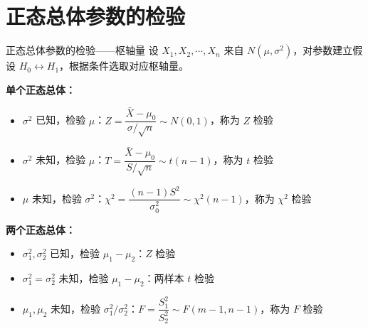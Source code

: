 \section{正态总体参数的检验}
\begin{definition}{正态总体参数的检验——枢轴量}
设 $X_1, X_2, \cdots, X_n$ 来自 $N(\mu, \sigma^2)$，对参数建立假设 $H_0 \leftrightarrow H_1$，根据条件选取对应枢轴量。

\textbf{单个正态总体：}
\begin{itemize}
    \item $\sigma^2$ 已知，检验 $\mu$：$Z = \dfrac{\bar{X}-\mu_0}{\sigma/\sqrt{n}} \sim N(0,1)$，称为 $Z$ 检验
    \item $\sigma^2$ 未知，检验 $\mu$：$T = \dfrac{\bar{X}-\mu_0}{S/\sqrt{n}} \sim t(n-1)$，称为 $t$ 检验
    \item $\mu$ 未知，检验 $\sigma^2$：$\chi^2 = \dfrac{(n-1)S^2}{\sigma_0^2} \sim \chi^2(n-1)$，称为 $\chi^2$ 检验
\end{itemize}

\textbf{两个正态总体：}
\begin{itemize}
    \item $\sigma_1^2, \sigma_2^2$ 已知，检验 $\mu_1-\mu_2$：$Z$ 检验
    \item $\sigma_1^2 = \sigma_2^2$ 未知，检验 $\mu_1-\mu_2$：两样本 $t$ 检验
    \item $\mu_1, \mu_2$ 未知，检验 $\sigma_1^2/\sigma_2^2$：$F = \dfrac{S_1^2}{S_2^2} \sim F(m-1, n-1)$，称为 $F$ 检验
\end{itemize}
\end{definition}

